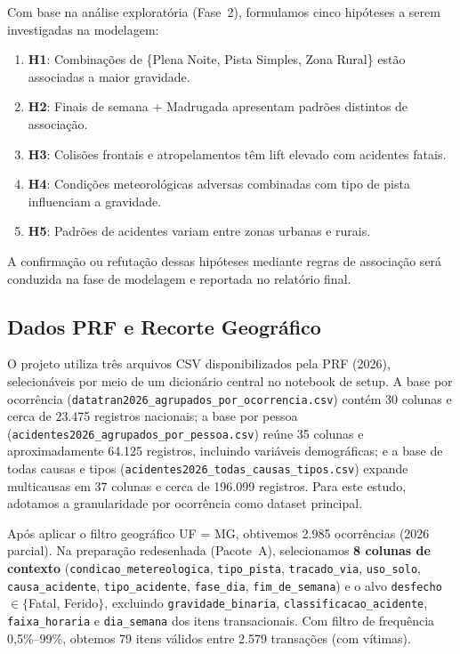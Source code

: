 \documentclass[12pt]{article}
\begin{document}
Com base na análise exploratória (Fase~2), formulamos cinco hipóteses a serem investigadas na modelagem:

\begin{enumerate}[leftmargin=*]
    \item \textbf{H1}: Combinações de \{Plena Noite, Pista Simples, Zona Rural\} estão associadas a maior gravidade.
    \item \textbf{H2}: Finais de semana + Madrugada apresentam padrões distintos de associação.
    \item \textbf{H3}: Colisões frontais e atropelamentos têm lift elevado com acidentes fatais.
    \item \textbf{H4}: Condições meteorológicas adversas combinadas com tipo de pista influenciam a gravidade.
    \item \textbf{H5}: Padrões de acidentes variam entre zonas urbanas e rurais.
\end{enumerate}

A confirmação ou refutação dessas hipóteses mediante regras de associação será conduzida na fase de modelagem e reportada no relatório final.

\subsection{Dados PRF e Recorte Geográfico}

O projeto utiliza três arquivos CSV disponibilizados pela PRF (2026), selecionáveis por meio de um dicionário central no notebook de setup. A base por ocorrência (\texttt{datatran2026\_agrupados\_por\_ocorrencia.csv}) contém 30 colunas e cerca de 23.475 registros nacionais; a base por pessoa (\texttt{acidentes2026\_agrupados\_por\_pessoa.csv}) reúne 35 colunas e aproximadamente 64.125 registros, incluindo variáveis demográficas; e a base de todas causas e tipos (\texttt{acidentes2026\_todas\_causas\_tipos.csv}) expande multicausas em 37 colunas e cerca de 196.099 registros. Para este estudo, adotamos a granularidade por ocorrência como dataset principal.

Após aplicar o filtro geográfico UF = MG, obtivemos 2.985 ocorrências (2026 parcial). Na preparação redesenhada (Pacote~A), selecionamos \textbf{8 colunas de contexto} (\texttt{condicao\_metereologica}, \texttt{tipo\_pista}, \texttt{tracado\_via}, \texttt{uso\_solo}, \texttt{causa\_acidente}, \texttt{tipo\_acidente}, \texttt{fase\_dia}, \texttt{fim\_de\_semana}) e o alvo \texttt{desfecho} $\in \{$Fatal, Ferido$\}$, excluindo \texttt{gravidade\_binaria}, \texttt{classificacao\_acidente}, \texttt{faixa\_horaria} e \texttt{dia\_semana} dos itens transacionais. Com filtro de frequência 0,5\%--99\%, obtemos 79 itens válidos entre 2.579 transações (com vítimas).
\end{document}

